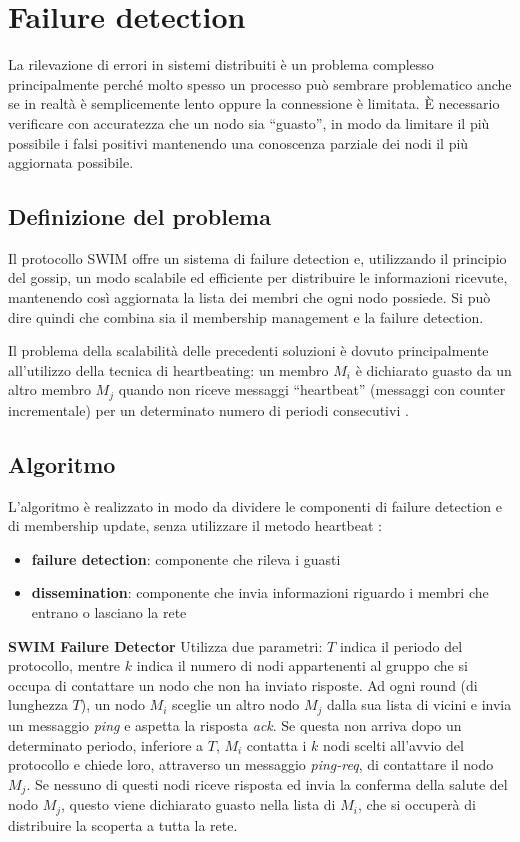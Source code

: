 \section{Failure detection}
La rilevazione di errori in sistemi distribuiti è un problema complesso \cite{failure_detection} principalmente perché molto spesso un processo può sembrare problematico anche se in realtà è semplicemente lento oppure la connessione è limitata. È necessario verificare con accuratezza che un nodo sia “guasto”, in modo da limitare il più possibile i falsi positivi mantenendo una conoscenza parziale dei nodi il più aggiornata possibile. 
\subsection{Definizione del problema}
Il protocollo SWIM \cite{swim} offre un sistema di failure detection e, utilizzando il principio del gossip, un modo scalabile ed efficiente per distribuire le informazioni ricevute, mantenendo così aggiornata la lista dei membri che ogni nodo possiede. Si può dire quindi che combina sia il membership management e la failure detection.

Il problema della scalabilità delle precedenti soluzioni è dovuto principalmente all’utilizzo della tecnica di heartbeating: un membro $M_i$ è dichiarato guasto da un altro membro $M_j$ quando non riceve messaggi “heartbeat” (messaggi con counter incrementale) per un determinato numero di periodi consecutivi \cite{swim}.
\subsection{Algoritmo}
L’algoritmo è realizzato in modo da dividere le componenti di failure detection e di membership update, senza utilizzare il metodo heartbeat \cite{swim}:
\begin{itemize}
    \item \textbf{failure detection}: componente che rileva i guasti
    \item \textbf{dissemination}: componente che invia informazioni riguardo i membri che entrano o lasciano la rete
\end{itemize}

\textbf{SWIM Failure Detector} Utilizza due parametri: $T$ indica il periodo del protocollo, mentre $k$ indica il numero di nodi appartenenti al gruppo che si occupa di contattare un nodo che non ha inviato risposte. Ad ogni round (di lunghezza $T$), un nodo $M_i$ sceglie un altro nodo $M_j$ dalla sua lista di vicini e invia un messaggio \textit{ping} e aspetta la risposta \textit{ack}. Se questa non arriva dopo un determinato periodo, inferiore a $T$, $M_i$ contatta i $k$ nodi scelti all’avvio del protocollo e chiede loro, attraverso un messaggio \textit{ping-req}, di contattare il nodo $M_j$. Se nessuno di questi nodi riceve risposta ed invia la conferma della salute del nodo $M_j$, questo viene dichiarato guasto nella lista di $M_i$, che si occuperà di distribuire la scoperta a tutta la rete.

